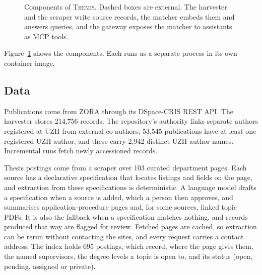 \documentclass[sigconf,nonacm]{acmart}
\newcommand{\sys}{\textsc{Themis}}
\begin{document}
\begin{figure}[t]
\centering
{}
\caption{Components of \sys{}. Dashed boxes are external. The harvester and the scraper write source records, the matcher embeds them and answers queries, and the gateway exposes the matcher to assistants as MCP tools.}
\label{fig:arch}
\end{figure}

Figure~\ref{fig:arch} shows the components. Each runs as a separate process in its own container image.

\subsection{Data}

Publications come from ZORA through its DSpace-CRIS REST API. The harvester stores 214,756 records. The repository's authority links separate authors registered at UZH from external co-authors; 53,545 publications have at least one registered UZH author, and these carry 2,942 distinct UZH author names. Incremental runs fetch newly accessioned records.

Thesis postings come from a scraper over 103 curated department pages. Each source has a declarative specification that locates listings and fields on the page, and extraction from these specifications is deterministic. A language model drafts a specification when a source is added, which a person then approves, and summarises application-procedure pages and, for some sources, linked topic PDFs. It is also the fallback when a specification matches nothing, and records produced that way are flagged for review. Fetched pages are cached, so extraction can be rerun without contacting the sites, and every request carries a contact address. The index holds 695 postings, which record, where the page gives them, the named supervisors, the degree levels a topic is open to, and its status (open, pending, assigned or private).
\end{document}
